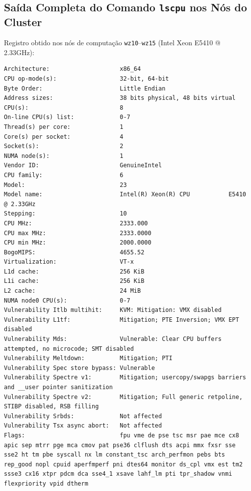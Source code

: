 \documentclass[12pt, a4paper, twoside, chapter=TITLE, subsection=TITLE, section=TITLE, subsubsection=TITLE, english, brazil]{abntex2}
\begin{document}
\begin{apendicesenv}
\partapendices

\chapter{Saída Completa do Comando \texttt{lscpu} nos Nós do Cluster}
\label{apendice:lscpu}

Registro obtido nos nós de computação \texttt{wz10}--\texttt{wz15} (Intel Xeon E5410 @ 2.33GHz):

\begin{lstlisting}[breaklines=true, basicstyle=\ttfamily\scriptsize]
Architecture:                    x86_64
CPU op-mode(s):                  32-bit, 64-bit
Byte Order:                      Little Endian
Address sizes:                   38 bits physical, 48 bits virtual
CPU(s):                          8
On-line CPU(s) list:             0-7
Thread(s) per core:              1
Core(s) per socket:              4
Socket(s):                       2
NUMA node(s):                    1
Vendor ID:                       GenuineIntel
CPU family:                      6
Model:                           23
Model name:                      Intel(R) Xeon(R) CPU           E5410  @ 2.33GHz
Stepping:                        10
CPU MHz:                         2333.000
CPU max MHz:                     2333.0000
CPU min MHz:                     2000.0000
BogoMIPS:                        4655.52
Virtualization:                  VT-x
L1d cache:                       256 KiB
L1i cache:                       256 KiB
L2 cache:                        24 MiB
NUMA node0 CPU(s):               0-7
Vulnerability Itlb multihit:     KVM: Mitigation: VMX disabled
Vulnerability L1tf:              Mitigation; PTE Inversion; VMX EPT disabled
Vulnerability Mds:               Vulnerable: Clear CPU buffers attempted, no microcode; SMT disabled
Vulnerability Meltdown:          Mitigation; PTI
Vulnerability Spec store bypass: Vulnerable
Vulnerability Spectre v1:        Mitigation; usercopy/swapgs barriers and __user pointer sanitization
Vulnerability Spectre v2:        Mitigation; Full generic retpoline, STIBP disabled, RSB filling
Vulnerability Srbds:             Not affected
Vulnerability Tsx async abort:   Not affected
Flags:                           fpu vme de pse tsc msr pae mce cx8 apic sep mtrr pge mca cmov pat pse36 clflush dts acpi mmx fxsr sse sse2 ht tm pbe syscall nx lm constant_tsc arch_perfmon pebs bts rep_good nopl cpuid aperfmperf pni dtes64 monitor ds_cpl vmx est tm2 ssse3 cx16 xtpr pdcm dca sse4_1 xsave lahf_lm pti tpr_shadow vnmi flexpriority vpid dtherm
\end{lstlisting}

\end{apendicesenv}
\end{document}
